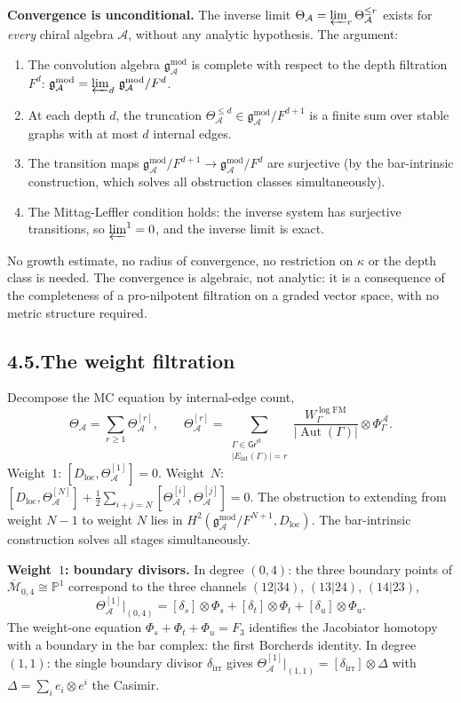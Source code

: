 \documentclass[11pt,reqno]{amsart}
\theoremstyle{definition}
\theoremstyle{remark}
\providecommand{\cA}{\mathcal{A}}
\providecommand{\cM}{\mathcal{M}}
\providecommand{\gAmod}{\mathfrak{g}^{\mathrm{mod}}_\cA}
\numberwithin{equation}{section}
\begin{document}
\medskip
\noindent\textbf{Convergence is unconditional.}\enspace
The inverse limit $\Theta_\cA=\varprojlim_r\Theta_\cA^{\le r}$ exists
for \emph{every} chiral algebra $\cA$, without any analytic hypothesis.
The argument:
\begin{enumerate}[label=(\roman*)]
\item The convolution algebra $\gAmod$ is complete with respect to the
depth filtration $F^d$: $\gAmod=\varprojlim_d\,\gAmod/F^d$.
\item At each depth $d$, the truncation
$\Theta_\cA^{\le d}\in\gAmod/F^{d+1}$ is a finite sum over stable
graphs with at most $d$ internal edges.
\item The transition maps $\gAmod/F^{d+1}\to\gAmod/F^d$ are
surjective (by the bar-intrinsic construction, which solves all
obstruction classes simultaneously).
\item The Mittag-Leffler condition holds: the inverse system has
surjective transitions, so $\varprojlim^1=0$, and the inverse limit
is exact.
\end{enumerate}
No growth estimate, no radius of convergence, no restriction on
$\kappa$ or the depth class is needed. The convergence is algebraic,
not analytic: it is a consequence of the completeness of a
pro-nilpotent filtration on a graded vector space, with no metric
structure required.

\subsection*{4.5.\enspace The weight filtration}

Decompose the MC equation by internal-edge count,
\[
\Theta_\cA=\sum_{r\ge 1}\Theta^{[r]}_\cA,\qquad\Theta^{[r]}_\cA=\sum_{\substack{\Gamma\in\mathsf{Gr}^{\mathrm{st}}\\|E_{\mathrm{int}}(\Gamma)|=r}}\frac{W^{\log\mathrm{FM}}_\Gamma}{|\operatorname{Aut}(\Gamma)|}\otimes\Phi^\cA_\Gamma.
\]
Weight~$1$: $[D_{\mathrm{loc}},\Theta^{[1]}_\cA]=0$. Weight~$N$:
$[D_{\mathrm{loc}},\Theta^{[N]}_\cA]+\tfrac12\sum_{i+j=N}[\Theta^{[i]}_\cA,\Theta^{[j]}_\cA]=0$.
The obstruction to extending from weight $N-1$ to weight $N$ lies in
$H^2(\gAmod/F^{N+1},D_{\mathrm{loc}})$. The bar-intrinsic
construction solves all stages simultaneously.

\medskip
\noindent\textbf{Weight~$1$: boundary divisors.}\enspace
In degree $(0,4)$: the three boundary points of
$\overline{\cM}_{0,4}\cong\mathbb P^1$ correspond to the three
channels $(12|34)$, $(13|24)$, $(14|23)$,
\[
\Theta^{[1]}_\cA\big|_{(0,4)}=[\delta_s]\otimes\Phi_s+[\delta_t]\otimes\Phi_t+[\delta_u]\otimes\Phi_u.
\]
The weight-one equation $\Phi_s+\Phi_t+\Phi_u=F_3$ identifies the
Jacobiator homotopy with a boundary in the bar complex: the first
Borcherds identity. In degree $(1,1)$: the single boundary divisor
$\delta_{\mathrm{irr}}$ gives
$\Theta^{[1]}_\cA|_{(1,1)}=[\delta_{\mathrm{irr}}]\otimes\Delta$ with
$\Delta=\sum_i e_i\otimes e^i$ the Casimir.
\end{document}

